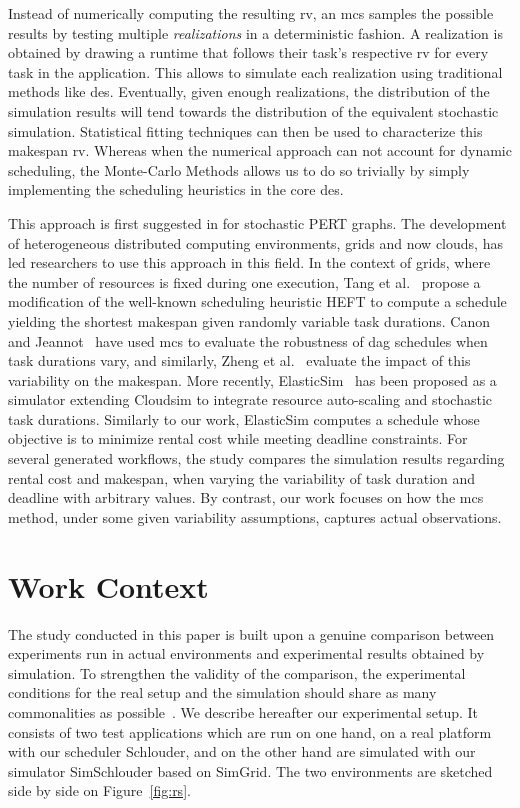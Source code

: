 \documentclass[]{llncs}
\begin{document}
Instead  of numerically computing  the resulting  \ac{rv}, an \ac{mcs} samples the possible
results by testing  multiple \emph{realizations} in a  deterministic fashion.  A
realization is obtained by drawing a runtime that follows their task's respective 
\ac{rv} for  every task in the  application. 
This allows to simulate each realization using traditional
methods like \ac{des}.  Eventually, given enough realizations, the distribution of
the simulation  results will  tend towards the  distribution of  the equivalent
stochastic  simulation.  Statistical  fitting  techniques can  then  be used  to
characterize this makespan \ac{rv}. Whereas when the numerical approach can not 
account for dynamic scheduling, the Monte-Carlo Methods allows us to do so 
trivially by simply implementing the scheduling heuristics in the core \ac{des}.

This approach is first suggested in \cite{Slyke63} for stochastic PERT graphs.
The development  of heterogeneous distributed computing  environments, grids and
now clouds,  has led  researchers to use  this approach in  this field.   In the
context of grids,  where the number of resources is  fixed during one execution,
Tang et  al.~\cite{Tang11} propose a  modification of the  well-known scheduling
heuristic  HEFT to  compute  a  schedule yielding  the  shortest makespan  given
randomly  variable task durations. Canon and Jeannot~\cite{Canon10} have used  \ac{mcs} to
evaluate  the robustness  of \ac{dag}  schedules when task durations  vary, and
similarly, Zheng et  al.~\cite{Zheng13} evaluate the impact  of this variability
on the makespan. More  recently, ElasticSim~\cite{Cai17} has been  proposed as a
simulator extending  Cloudsim to integrate resource  auto-scaling and stochastic
task durations. Similarly  to our  work, ElasticSim  computes a  schedule whose
objective  is  to  minimize  rental  cost while meeting deadline
constraints.  For  several  generated workflows, the  study compares the  simulation results regarding  rental cost
and makespan,  when varying the variability  of task duration and  deadline with
arbitrary  values.  By  contrast,  our  work
focuses on how the \ac{mcs} method, under some given variability assumptions, 
captures actual observations.


\section{Work Context}
\label{sec:work-context}

The  study conducted  in this  paper  is built upon a genuine comparison  between
experiments  run in  actual environments  and experimental  results obtained  by
simulation.   To strengthen  the validity  of the  comparison, the  experimental
conditions  for  the  real  setup  and  the  simulation  should  share  as  many
commonalities  as   possible~\cite{PucherGWK15}.   We  describe   hereafter  our
experimental setup.  It consists of two  test applications which are  run on one
hand, on a real platform with our scheduler Schlouder, and on the other hand are
simulated  with   our  simulator  SimSchlouder   based  on  SimGrid.    The  two
environments are sketched side by side on Figure~\ref{fig:rs}.
\end{document}
